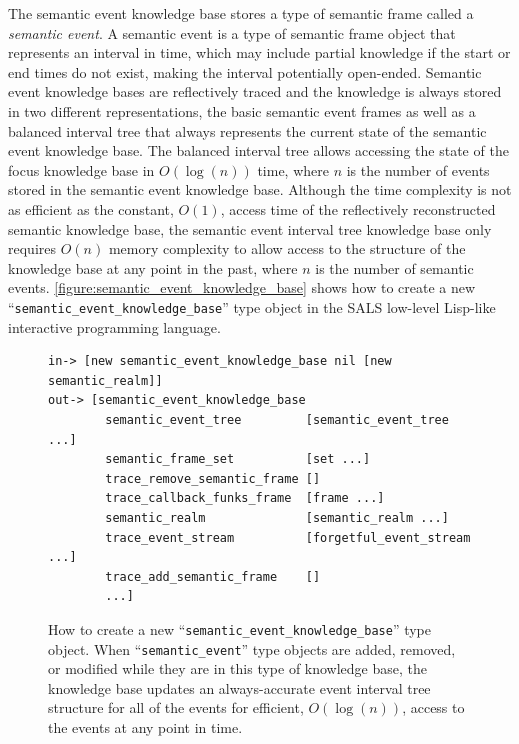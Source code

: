 The semantic event knowledge base stores a type of semantic frame
called a {\emph{semantic event}}.  A semantic event is a type of
semantic frame object that represents an interval in time, which may
include partial knowledge if the start or end times do not exist,
making the interval potentially open-ended.  Semantic event knowledge
bases are reflectively traced and the knowledge is always stored in
two different representations, the basic semantic event frames as well
as a balanced interval tree that always represents the current state
of the semantic event knowledge base.  The balanced interval tree
allows accessing the state of the focus knowledge base in
$O(\log{(n)})$ time, where $n$ is the number of events stored in the
semantic event knowledge base.  Although the time complexity is not as
efficient as the constant, $O(1)$, access time of the reflectively
reconstructed semantic knowledge base, the semantic event interval
tree knowledge base only requires $O(n)$ memory complexity to allow
access to the structure of the knowledge base at any point in the
past, where $n$ is the number of semantic events.
{\mbox{\autoref{figure:semantic_event_knowledge_base}}} shows how to
create a new ``{\tt{semantic\_event\_knowledge\_base}}'' type object
in the SALS low-level Lisp-like interactive programming language.
\begin{figure}[h]
\centering
{\scriptsize
\begin{Verbatim}[frame=single]
 in-> [new semantic_event_knowledge_base nil [new semantic_realm]]
out-> [semantic_event_knowledge_base
        semantic_event_tree         [semantic_event_tree ...]
        semantic_frame_set          [set ...]
        trace_remove_semantic_frame []
        trace_callback_funks_frame  [frame ...]
        semantic_realm              [semantic_realm ...]
        trace_event_stream          [forgetful_event_stream ...]
        trace_add_semantic_frame    []
        ...]
\end{Verbatim}
}
\caption[How to create a new
  ``{\tt{semantic\_event\_knowledge\_base}}'' type object.]{How to
  create a new ``{\tt{semantic\_event\_knowledge\_base}}'' type
  object.  When ``{\tt{semantic\_event}}'' type objects are added,
  removed, or modified while they are in this type of knowledge base,
  the knowledge base updates an always-accurate event interval tree
  structure for all of the events for efficient, $O(\log{(n)})$,
  access to the events at any point in time.}
\label{figure:semantic_event_knowledge_base}
\end{figure}

